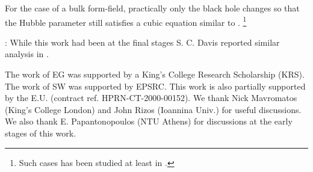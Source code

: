 \documentclass[a4paper,a4paper]{article}
\begin{document}
For the case of a bulk form-field, practically only the black hole changes so
that the Hubble parameter
still satisfies a cubic equation similar to \myHighlight{$(\ref{h})$}\coordHE{}. 
\footnote{Such cases has been studied
at least in \coordHE{}.}

\coordHE{}: While this work had been at the final stages S. C. Davis
reported similar analysis in \coordHE{}. 

\coordHE{}

The work of EG was supported by a King's College Research Scholarship (KRS). The
work of SW was supported by EPSRC. This work is also partially supported
by the E.U. (contract ref. HPRN-CT-2000-00152). We thank Nick Mavromatos (King's College London)
and John Rizos (Ioannina Univ.) for useful
discussions.
We also thank 
E. Papantonopoulos (NTU Athens) for
discussions at the early stages of this work.
\end{document}
